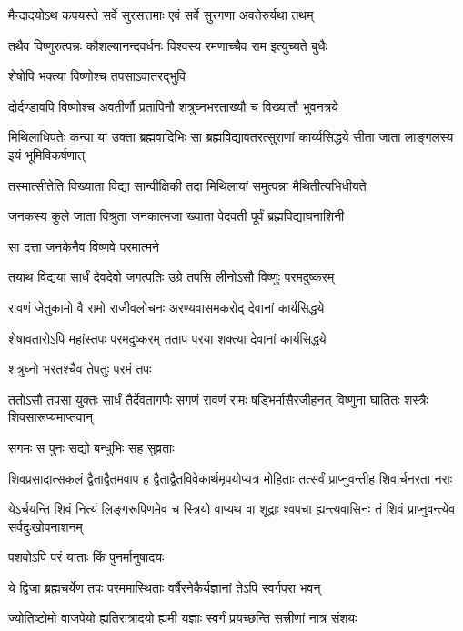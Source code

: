 \twolineshloka
{मैन्दादयोऽथ कपयस्ते सर्वे सुरसत्तमाः}
{एवं सर्वे सुरगणा अवतेरुर्यथा तथम्}%

\twolineshloka
{तथैव विष्णुरुत्पन्नः कौशल्यानन्दवर्धनः}
{विश्वस्य रमणाच्चैव राम इत्युच्यते बुधैः}%

\onelineshloka
{शेषोपि भक्त्या विष्णोश्च तपसाऽवातरद्भुवि}%

\twolineshloka
{दोर्दण्डावपि विष्णोश्च अवतीर्णौ प्रतापिनौ}
{शत्रुघ्नभरताख्यौ च विख्यातौ भुवनत्रये}%

\threelineshloka
{मिथिलाधिपतेः कन्या या उक्ता ब्रह्मवादिभिः}
{सा ब्रह्मविद्यावतरत्सुराणां कार्य्यसिद्धये}
{सीता जाता लाङ्गलस्य इयं भूमिविकर्षणात्}%

\twolineshloka
{तस्मात्सीतेति विख्याता विद्या सान्वीक्षिकी तदा}
{मिथिलायां समुत्पन्ना मैथितीत्यभिधीयते}%

\twolineshloka
{जनकस्य कुले जाता विश्रुता जनकात्मजा}
{ख्याता वेदवती पूर्वं ब्रह्मविद्याघनाशिनी}%

\onelineshloka
{सा दत्ता जनकेनैव विष्णवे परमात्मने}%

\twolineshloka
{तयाथ विद्यया सार्धं देवदेवो जगत्पतिः}
{उग्रे तपसि लीनोऽसौ विष्णुः परमदुष्करम्}%

\twolineshloka
{रावणं जेतुकामो वै रामो राजीवलोचनः}
{अरण्यवासमकरोद् देवानां कार्यसिद्धये}%

\twolineshloka
{शेषावतारोऽपि महांस्तपः परमदुष्करम्}
{तताप परया शक्त्या देवानां कार्यसिद्धये}%

\onelineshloka
{शत्रुघ्नो भरतश्चैव तेपतुः परमं तपः}%

\threelineshloka
{ततोऽसौ तपसा युक्तः सार्धं तैर्देवतागणैः}
{सगणं रावणं रामः षड्भिर्मासैरजीहनत्}
{विष्णुना घातितः शस्त्रैः शिवसारूप्यमाप्तवान्}%

\onelineshloka
{सगमः स पुनः सद्यो बन्धुभिः सह सुव्रताः}%

\threelineshloka
{शिवप्रसादात्सकलं द्वैताद्वैतमवाप ह}
{द्वैताद्वैतविवेकार्थमृपयोप्यत्र मोहिताः}
{तत्सर्वं प्राप्नुवन्तीह शिवार्चनरता नराः}%

\threelineshloka
{येऽर्चयन्ति शिवं नित्यं लिङ्गरूपिणमेव च}
{स्त्रियो वाप्यथ वा शूद्राः श्वपचा ह्यन्त्यवासिनः}
{तं शिवं प्राप्नुवन्त्येव सर्वदुःखोपनाशनम्}%

\onelineshloka
{पशवोऽपि परं याताः किं पुनर्मानुषादयः}%

\twolineshloka
{ये द्विजा ब्रह्मचर्येण तपः परममास्थिताः}
{वर्षैरनेकैर्यज्ञानां तेऽपि स्वर्गपरा भवन्}%

\twolineshloka
{ज्योतिष्टोमो वाजपेयो ह्यतिरात्रादयो ह्यमी}
{यज्ञाः स्वर्गं प्रयच्छन्ति सत्त्रीणां नात्र संशयः}%

